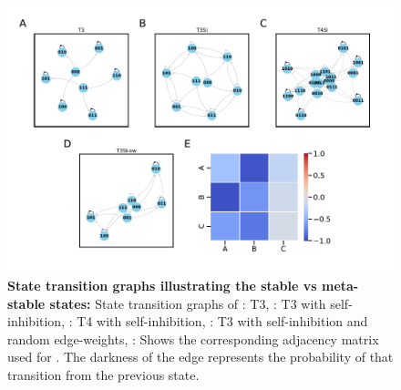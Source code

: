 \documentclass[11pt,a4paper]{article}
\theoremstyle{definition}
\theoremstyle{remark}
\begin{document}
\begin{figure}[h]
    \begin{subfigure}[c]{\textwidth}
        \label{stg-T3}
    \end{subfigure}
    \begin{subfigure}[c]{\textwidth}
        \label{stg-T3SI}
    \end{subfigure}
    \begin{subfigure}[c]{\textwidth}
        \label{stg-T4SI}
    \end{subfigure}
    \begin{subfigure}[c]{\textwidth}
        \label{stg-T3SI-ew}
    \end{subfigure}
    \begin{subfigure}[c]{\textwidth}
        \label{adjmat-T3SI-ew}
    \end{subfigure}
    \centering
    \includegraphics[width=\textwidth]{figures/FigureS5}
    \caption{\textbf{State transition graphs illustrating the stable vs meta-stable states:} State transition graphs of : T3, : T3 with self-inhibition, : T4 with self-inhibition, : T3 with self-inhibition and random edge-weights, : Shows the corresponding adjacency matrix used for . The darkness of the edge represents the probability of that transition from the previous state.}
    \label{STG-graphs}
\end{figure}
\end{document}
